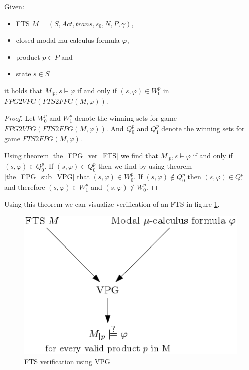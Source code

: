 \begin{theorem}
	\label{the_VPG_ver_FTS}
	Given:
	\begin{itemize}
		\item FTS $M = (S, Act, trans, s_0, N, P, \gamma)$,
		\item closed modal mu-calculus formula $\varphi$,
		\item product $p \in P$ and
		\item state $s \in S$
	\end{itemize}
	it holds that $M_{|p}, s \models \varphi$ if and only if $(s, \varphi) \in W_0^{p}$ in $\textit{FPG2VPG}(\textit{FTS2FPG}(M, \varphi))$.
	\begin{proof}
		Let $W_0^{p}$ and $W_1^{p}$ denote the winning sets for game $\textit{FPG2VPG}(\textit{FTS2FPG}(M, \varphi))$. And $Q_0^{p}$ and $Q_1^{p}$ denote the winning sets for game $\textit{FTS2FPG}(M, \varphi)$.
		
		Using theorem \ref{the_FPG_ver_FTS} we find that $M_{|p}, s \models \varphi$ if and only if $(s, \varphi) \in Q_0^{p}$. If $(s, \varphi) \in Q_0^{p}$ then we find by using theorem \ref{the_FPG_sub_VPG} that $(s, \varphi) \in W_0^{p}$. If $(s, \varphi) \not\in Q_0^{p}$ then $(s, \varphi) \in Q_1^{p}$ and therefore $(s, \varphi) \in W_1^{p}$ and $(s, \varphi) \not\in W_0^{p}$.
	\end{proof}
\end{theorem}
Using this theorem we can visualize verification of an FTS in figure \ref{fig:ftsverificationusingvpg}.
\begin{figure}[h]
	\centering
	\includegraphics[scale=0.5]{Diagrams/FTSVerificationUsingVPG}
	\caption[FTS verification using VPG]{FTS verification using VPG}
	\label{fig:ftsverificationusingvpg}
\end{figure}
